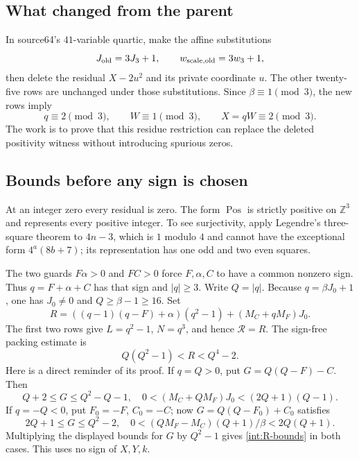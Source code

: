 \subsection{What changed from the parent}
\label{int:parent}

In source64's $41$-variable quartic, make the affine substitutions
\[
 J_{\rm old}=3J_3+1,\qquad
 w_{{\rm scale},\rm old}=3w_3+1,
\]
then delete the residual $X-2u^2$ and its private coordinate $u$.
The other twenty-five rows are unchanged under those substitutions.
Since $\beta\equiv1\pmod3$, the new rows imply
\begin{equation}\label{int:orientation-residue}
 q\equiv2\pmod3,\qquad W\equiv1\pmod3,
 \qquad X=qW\equiv2\pmod3.
\end{equation}
The work is to prove that this residue restriction can replace the deleted
positivity witness without introducing spurious zeros.

\subsection{Bounds before any sign is chosen}
\label{int:bounds}

At an integer zero every residual is zero.  The form
$\operatorname{Pos}$ is strictly positive on $\mathbb Z^3$ and represents
every positive integer.  To see surjectivity, apply Legendre's three-square
theorem to $4n-3$, which is $1$ modulo $4$ and cannot have the exceptional
form $4^a(8b+7)$; its representation has one odd and two even squares.

The two guards $F\alpha>0$ and $FC>0$ force $F,\alpha,C$ to have a common
nonzero sign.  Thus $q=F+\alpha+C$ has that sign and $|q|\geq3$.
Write $Q=|q|$.  Because $q=\beta J_0+1$, one has $J_0\neq0$ and
$Q\geq\beta-1\geq16$.  Set
\[
 R=((q-1)(q-F)+\alpha)(q^2-1)+(M_C+qM_F)J_0.
\]
The first two rows give $L=q^2-1$, $N=q^3$, and hence $\mathcal R=R$.
The sign-free packing estimate is
\begin{equation}\label{int:R-bounds}
       Q(Q^2-1)<R<Q^4-2.
\end{equation}
Here is a direct reminder of its proof.  If $q=Q>0$, put
$G=Q(Q-F)-C$.  Then
\[
 Q+2\leq G\leq Q^2-Q-1,
 \quad0<(M_C+QM_F)J_0<(2Q+1)(Q-1).
\]
If $q=-Q<0$, put $F_0=-F$, $C_0=-C$; now
$G=Q(Q-F_0)+C_0$ satisfies
\[
 2Q+1\leq G\leq Q^2-2,
 \quad0<(QM_F-M_C)(Q+1)/\beta<2Q(Q+1).
\]
Multiplying the displayed bounds for $G$ by $Q^2-1$ gives
\eqref{int:R-bounds} in both cases.  This uses no sign of $X,Y,k$.

